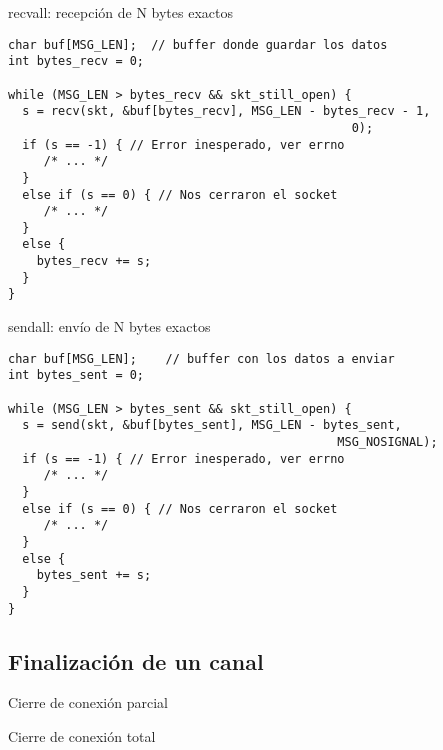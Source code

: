 \begin{frame}[fragile]{recvall: recepci\'on de N bytes exactos}
      \begin{lstlisting}[style=normal]
char buf[MSG_LEN];  // buffer donde guardar los datos
int bytes_recv = 0;

while (MSG_LEN > bytes_recv && skt_still_open) {
  s = recv(skt, &buf[bytes_recv], MSG_LEN - bytes_recv - 1,
                                                0);
  if (s == -1) { // Error inesperado, ver errno
     /* ... */
  }
  else if (s == 0) { // Nos cerraron el socket
     /* ... */
  }
  else {
    bytes_recv += s;
  }
}
      \end{lstlisting}
\end{frame}
\begin{frame}[fragile]{sendall: env\'io de N bytes exactos}
      \begin{lstlisting}[style=normal]
char buf[MSG_LEN];    // buffer con los datos a enviar
int bytes_sent = 0;

while (MSG_LEN > bytes_sent && skt_still_open) {
  s = send(skt, &buf[bytes_sent], MSG_LEN - bytes_sent,
                                              MSG_NOSIGNAL);
  if (s == -1) { // Error inesperado, ver errno
     /* ... */
  }
  else if (s == 0) { // Nos cerraron el socket
     /* ... */
  }
  else {
    bytes_sent += s;
  }
}
      \end{lstlisting}
\end{frame}

\subsection{Finalizaci\'on de un canal}
\begin{frame}{Cierre de conexi\'on parcial}
\end{frame}

\begin{frame}{Cierre de conexi\'on total}
\end{frame}

